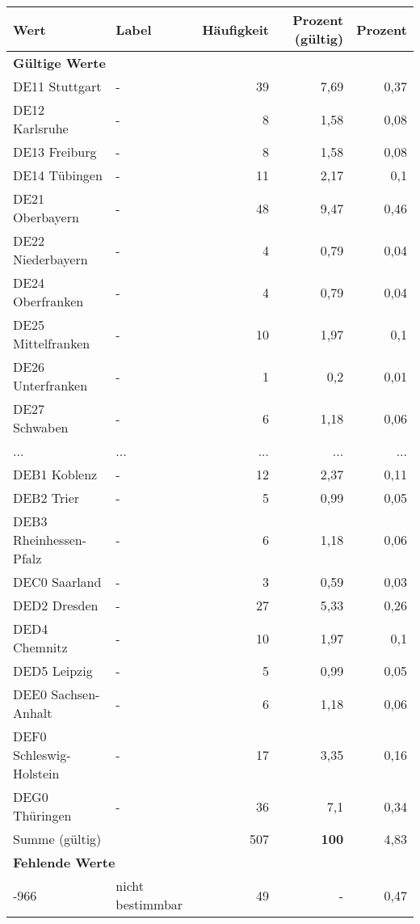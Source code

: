     \begin{longtable}{Xlrrr}
     \toprule
     \textbf{Wert} & \textbf{Label} & \textbf{Häufigkeit} & \textbf{Prozent (gültig)} & \textbf{Prozent} \\
     \endhead
     \midrule
     \multicolumn{5}{l}{\textbf{Gültige Werte}}\\
        \multicolumn{1}{X}{DE11 Stuttgart} & - & 39 & 7,69 & 0,37 \\
        \multicolumn{1}{X}{DE12 Karlsruhe} & - & 8 & 1,58 & 0,08 \\
        \multicolumn{1}{X}{DE13 Freiburg} & - & 8 & 1,58 & 0,08 \\
        \multicolumn{1}{X}{DE14 Tübingen} & - & 11 & 2,17 & 0,1 \\
        \multicolumn{1}{X}{DE21 Oberbayern} & - & 48 & 9,47 & 0,46 \\
        \multicolumn{1}{X}{DE22 Niederbayern} & - & 4 & 0,79 & 0,04 \\
        \multicolumn{1}{X}{DE24 Oberfranken} & - & 4 & 0,79 & 0,04 \\
        \multicolumn{1}{X}{DE25 Mittelfranken} & - & 10 & 1,97 & 0,1 \\
        \multicolumn{1}{X}{DE26 Unterfranken} & - & 1 & 0,2 & 0,01 \\
        \multicolumn{1}{X}{DE27 Schwaben} & - & 6 & 1,18 & 0,06 \\
       ... & ... & ... & ... & ... \\
        \multicolumn{1}{X}{DEB1 Koblenz} & - & 12 & 2,37 & 0,11 \\
        \multicolumn{1}{X}{DEB2 Trier} & - & 5 & 0,99 & 0,05 \\
        \multicolumn{1}{X}{DEB3 Rheinhessen-Pfalz} & - & 6 & 1,18 & 0,06 \\
        \multicolumn{1}{X}{DEC0 Saarland} & - & 3 & 0,59 & 0,03 \\
        \multicolumn{1}{X}{DED2 Dresden} & - & 27 & 5,33 & 0,26 \\
        \multicolumn{1}{X}{DED4 Chemnitz} & - & 10 & 1,97 & 0,1 \\
        \multicolumn{1}{X}{DED5 Leipzig} & - & 5 & 0,99 & 0,05 \\
        \multicolumn{1}{X}{DEE0 Sachsen-Anhalt} & - & 6 & 1,18 & 0,06 \\
        \multicolumn{1}{X}{DEF0 Schleswig-Holstein} & - & 17 & 3,35 & 0,16 \\
        \multicolumn{1}{X}{DEG0 Thüringen} & - & 36 & 7,1 & 0,34 \\
     \midrule
      \multicolumn{2}{l}{Summe (gültig)} & 507 &
      \textbf{100} &
         4,83 \\
     \multicolumn{5}{l}{\textbf{Fehlende Werte}}\\
       -966 & nicht bestimmbar & 49 & - & 0,47 \\


\end{longtable}
